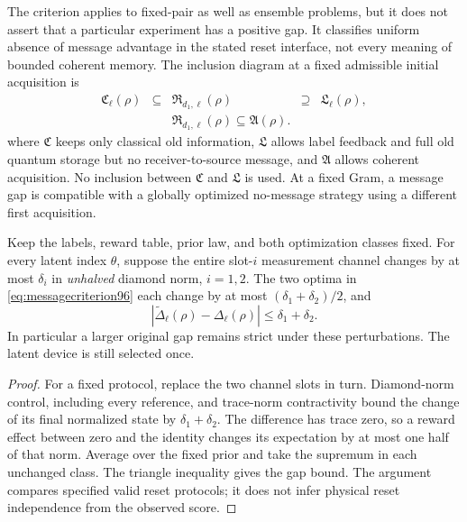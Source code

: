 The criterion applies to fixed-pair as well as ensemble problems, but
it does not assert that a particular experiment has a positive gap.
It classifies uniform absence of message advantage in the stated
reset interface, not every meaning of bounded coherent memory.
The inclusion diagram at a fixed admissible initial acquisition is
\[
 \begin{array}{ccccc}
 \mathfrak C_\ell(\rho)&\subseteq&\mathfrak R_{d_1,\ell}(\rho)
                                      &\supseteq&\mathfrak L_\ell(\rho),\\
 &&\mathfrak R_{d_1,\ell}(\rho)\subseteq\mathfrak A(\rho).&&
 \end{array}
\]
where $\mathfrak C$ keeps only classical old information,
$\mathfrak L$ allows label feedback and full old quantum storage but
no receiver-to-source message, and $\mathfrak A$ allows coherent
acquisition.  No inclusion between $\mathfrak C$ and $\mathfrak L$
is used.  At a fixed Gram, a message gap is compatible with a globally
optimized no-message strategy using a different first acquisition.

\begin{corollary}\label{cor:messageperturb96}
Keep the labels, reward table, prior law, and both optimization classes
fixed.  For every latent index $\theta$, suppose the entire slot-$i$
measurement channel changes by at most $\delta_i$ in \emph{unhalved}
diamond norm, $i=1,2$.  The two optima in
\eqref{eq:messagecriterion96} each change by at most
$(\delta_1+\delta_2)/2$, and
\[
       |\widetilde\Delta_\ell(\rho)-\Delta_\ell(\rho)|
                                             \le\delta_1+\delta_2.
\]
In particular a larger original gap remains strict under these
perturbations.  The latent device is still selected once.
\end{corollary}
\begin{proof}
For a fixed protocol, replace the two channel slots in turn.
Diamond-norm control, including every reference, and trace-norm
contractivity bound the change of its final normalized state by
$\delta_1+\delta_2$.  The difference has trace zero, so a reward effect
between zero and the identity changes its expectation by at most
one half of that norm.  Average over the fixed prior and take the
supremum in each unchanged class.  The triangle inequality gives
the gap bound.  The argument compares specified valid reset protocols;
it does not infer physical reset independence from the observed score.
\end{proof}
